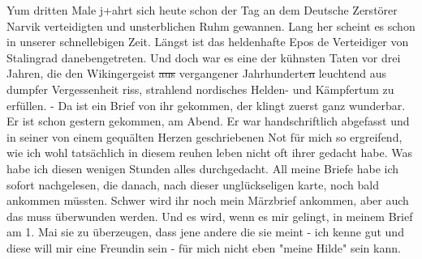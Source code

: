 \def\day{10. April 1943}
\mktitle

Yum dritten Male j+ahrt sich heute schon der Tag an dem Deutsche Zerst\"{o}rer Narvik verteidigten und unsterblichen Ruhm gewannen.
Lang her scheint es schon in unserer schnellebigen Zeit.
L\"{a}ngst ist das heldenhafte Epos de Verteidiger von Stalingrad danebengetreten.
Und doch war es eine der k\"{u}hnsten Taten vor drei Jahren, die den Wikingergeist \st{aus} vergangener Jahrhunderte\st{n} leuchtend aus dumpfer Vergessenheit riss, strahlend nordisches Helden- und K\"{a}mpfertum zu erf\"{u}llen.
- Da ist ein Brief von ihr gekommen, der klingt zuerst ganz wunderbar.
Er ist schon gestern gekommen, am Abend.
Er war handschriftlich abgefasst und in seiner von einem gequ\"{a}lten Herzen geschriebenen Not f\"{u}r mich so ergreifend, wie ich wohl tats\"{a}chlich in diesem reuhen leben nicht oft ihrer gedacht habe.
Was habe ich diesen wenigen Stunden alles durchgedacht.
All meine Briefe habe ich sofort nachgelesen, die danach, nach dieser ungl\"{u}ckseligen karte, noch bald ankommen m\"{u}ssten.
Schwer wird ihr noch mein M\"{a}rzbrief ankommen, aber auch das muss \"{u}berwunden werden.
Und es wird, wenn es mir gelingt, in meinem Brief am 1. Mai sie zu \"{u}berzeugen, dass jene andere die sie meint - ich kenne gut und diese will mir eine Freundin sein - f\"{u}r mich nicht eben "meine Hilde" sein kann.


\clearpage
